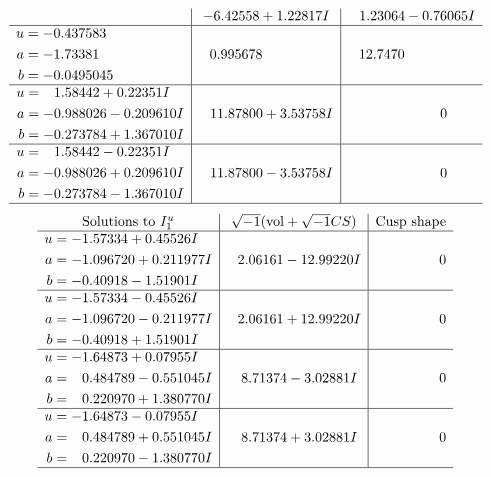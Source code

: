 \documentclass[1p]{elsarticle_modified}
\theoremstyle{definition}
\newcommand{\I}{\sqrt{-1}}
\begin{document}
$$\begin{array}{c|c|c}
 & -6.42558 + 1.22817 I & \phantom{-}1.23064 - 0.76065 I \\ \hline\begin{aligned}
u &= -0.437583\phantom{ +0.000000I} \\
a &= -1.73381\phantom{ +0.000000I} \\
b &= -0.0495045\phantom{ +0.000000I}\end{aligned}
 & \phantom{-}0.995678\phantom{ +0.000000I} & \phantom{-}12.7470\phantom{ +0.000000I} \\ \hline\begin{aligned}
u &= \phantom{-}1.58442 + 0.22351 I \\
a &= -0.988026 - 0.209610 I \\
b &= -0.273784 + 1.367010 I\end{aligned}
 & \phantom{-}11.87800 + 3.53758 I & \phantom{-0.000000 } 0 \\ \hline\begin{aligned}
u &= \phantom{-}1.58442 - 0.22351 I \\
a &= -0.988026 + 0.209610 I \\
b &= -0.273784 - 1.367010 I\end{aligned}
 & \phantom{-}11.87800 - 3.53758 I & \phantom{-0.000000 } 0\\
 \hline 
 \end{array}$$\newpage$$\begin{array}{c|c|c}  
\text{Solutions to }I^u_{1}& \I (\text{vol} + \sqrt{-1}CS) & \text{Cusp shape}\\
 \hline 
\begin{aligned}
u &= -1.57334 + 0.45526 I \\
a &= -1.096720 + 0.211977 I \\
b &= -0.40918 - 1.51901 I\end{aligned}
 & \phantom{-}2.06161 - 12.99220 I & \phantom{-0.000000 } 0 \\ \hline\begin{aligned}
u &= -1.57334 - 0.45526 I \\
a &= -1.096720 - 0.211977 I \\
b &= -0.40918 + 1.51901 I\end{aligned}
 & \phantom{-}2.06161 + 12.99220 I & \phantom{-0.000000 } 0 \\ \hline\begin{aligned}
u &= -1.64873 + 0.07955 I \\
a &= \phantom{-}0.484789 - 0.551045 I \\
b &= \phantom{-}0.220970 + 1.380770 I\end{aligned}
 & \phantom{-}8.71374 - 3.02881 I & \phantom{-0.000000 } 0 \\ \hline\begin{aligned}
u &= -1.64873 - 0.07955 I \\
a &= \phantom{-}0.484789 + 0.551045 I \\
b &= \phantom{-}0.220970 - 1.380770 I\end{aligned}
 & \phantom{-}8.71374 + 3.02881 I & \phantom{-0.000000 } 0\\
 \hline 
 \end{array}$$\newpage\newpage\renewcommand{\arraystretch}{1}
\end{document}
